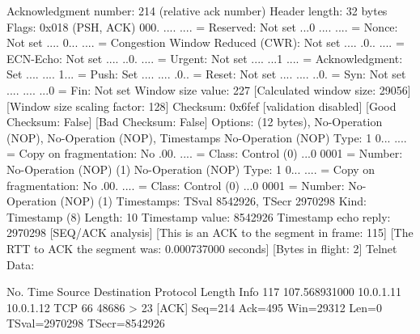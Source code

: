     Acknowledgment number: 214    (relative ack number)
    Header length: 32 bytes
    Flags: 0x018 (PSH, ACK)
        000. .... .... = Reserved: Not set
        ...0 .... .... = Nonce: Not set
        .... 0... .... = Congestion Window Reduced (CWR): Not set
        .... .0.. .... = ECN-Echo: Not set
        .... ..0. .... = Urgent: Not set
        .... ...1 .... = Acknowledgment: Set
        .... .... 1... = Push: Set
        .... .... .0.. = Reset: Not set
        .... .... ..0. = Syn: Not set
        .... .... ...0 = Fin: Not set
    Window size value: 227
    [Calculated window size: 29056]
    [Window size scaling factor: 128]
    Checksum: 0x6fef [validation disabled]
        [Good Checksum: False]
        [Bad Checksum: False]
    Options: (12 bytes), No-Operation (NOP), No-Operation (NOP), Timestamps
        No-Operation (NOP)
            Type: 1
                0... .... = Copy on fragmentation: No
                .00. .... = Class: Control (0)
                ...0 0001 = Number: No-Operation (NOP) (1)
        No-Operation (NOP)
            Type: 1
                0... .... = Copy on fragmentation: No
                .00. .... = Class: Control (0)
                ...0 0001 = Number: No-Operation (NOP) (1)
        Timestamps: TSval 8542926, TSecr 2970298
            Kind: Timestamp (8)
            Length: 10
            Timestamp value: 8542926
            Timestamp echo reply: 2970298
    [SEQ/ACK analysis]
        [This is an ACK to the segment in frame: 115]
        [The RTT to ACK the segment was: 0.000737000 seconds]
        [Bytes in flight: 2]
Telnet
    Data: 

No.     Time           Source                Destination           Protocol Length Info
    117 107.568931000  10.0.1.11             10.0.1.12             TCP      66     48686 > 23 [ACK] Seq=214 Ack=495 Win=29312 Len=0 TSval=2970298 TSecr=8542926

